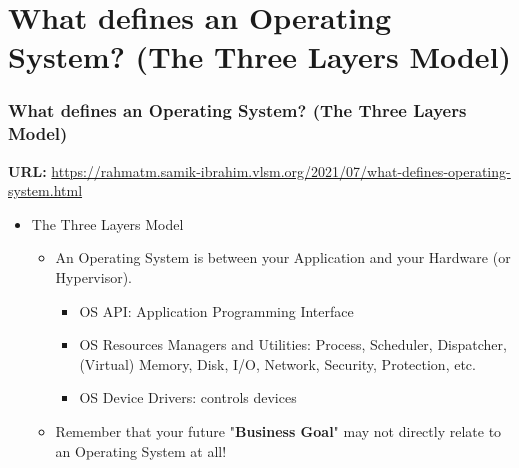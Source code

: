 \documentclass[aspectratio=169, xcolor=table, notheorems, hyperref={pdfpagelabels=false}]{beamer}
\begin{document}
\section{What defines an Operating System? (The Three Layers Model)}
\begin{frame}
\frametitle{What defines an Operating System? (The Three Layers Model)}
\textbf{URL:} {\footnotesize \url{https://rahmatm.samik-ibrahim.vlsm.org/2021/07/what-defines-operating-system.html}}
\begin{multicols}{2}
\begin{table}
\end{table}
  \vfill \null
\columnbreak
  \begin{itemize}
    \item The Three Layers Model
  \begin{itemize}
    \item An Operating System is between your Application and your Hardware (or Hypervisor).
  \begin{itemize}
    \item OS API: Application Programming Interface
    \item OS Resources Managers and Utilities: Process, Scheduler, Dispatcher, 
             (Virtual) Memory, Disk, I/O, Network, Security, Protection, etc.
    \item OS Device Drivers: controls devices
  \end{itemize}
    \item Remember that your future "\textbf{Business Goal}" may not directly relate to an Operating System at all!
  \end{itemize}
  \end{itemize}
  \vfill \null
\end{multicols}
\end{frame}
\end{document}
